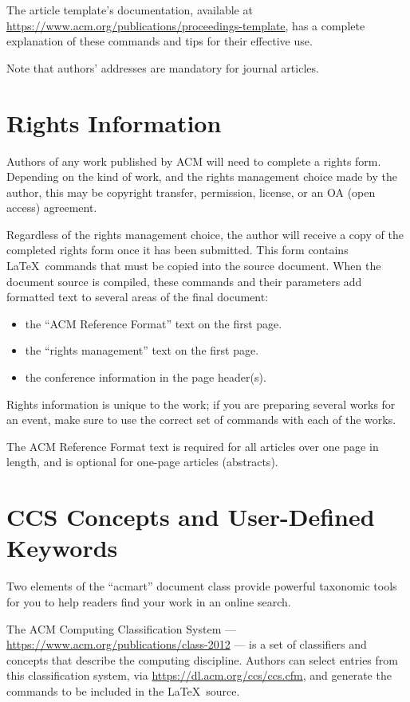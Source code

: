 \documentclass[acmlarge]{acmart}
\begin{document}
The article template's documentation, available at
\url{https://www.acm.org/publications/proceedings-template}, has a
complete explanation of these commands and tips for their effective
use.

Note that authors' addresses are mandatory for journal articles.

\section{Rights Information}

Authors of any work published by ACM will need to complete a rights
form. Depending on the kind of work, and the rights management choice
made by the author, this may be copyright transfer, permission,
license, or an OA (open access) agreement.

Regardless of the rights management choice, the author will receive a
copy of the completed rights form once it has been submitted. This
form contains \LaTeX\ commands that must be copied into the source
document. When the document source is compiled, these commands and
their parameters add formatted text to several areas of the final
document:
\begin{itemize}
\item the ``ACM Reference Format'' text on the first page.
\item the ``rights management'' text on the first page.
\item the conference information in the page header(s).
\end{itemize}

Rights information is unique to the work; if you are preparing several
works for an event, make sure to use the correct set of commands with
each of the works.

The ACM Reference Format text is required for all articles over one
page in length, and is optional for one-page articles (abstracts).

\section{CCS Concepts and User-Defined Keywords}

Two elements of the ``acmart'' document class provide powerful
taxonomic tools for you to help readers find your work in an online
search.

The ACM Computing Classification System ---
\url{https://www.acm.org/publications/class-2012} --- is a set of
classifiers and concepts that describe the computing
discipline. Authors can select entries from this classification
system, via \url{https://dl.acm.org/ccs/ccs.cfm}, and generate the
commands to be included in the \LaTeX\ source.
\end{document}
